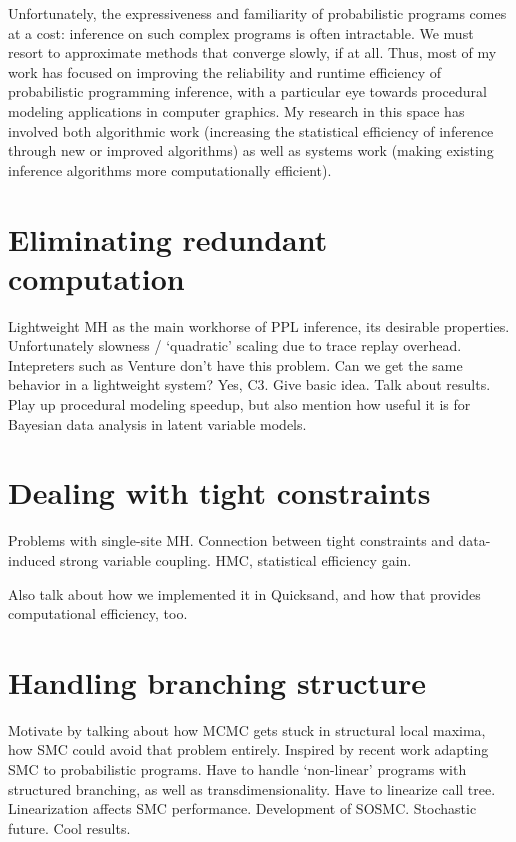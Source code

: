 \documentclass[
11pt, %
a4paper, %
oneside, %
headinclude,footinclude, %
BCOR5mm, %
]{scrartcl}
\begin{document}
Unfortunately, the expressiveness and familiarity of probabilistic programs comes at a cost: inference on such complex programs is often intractable. We must resort to approximate methods that converge slowly, if at all. Thus, most of my work has focused on improving the reliability and runtime efficiency of probabilistic programming inference, with a particular eye towards procedural modeling applications in computer graphics. My research in this space has involved both algorithmic work (increasing the statistical efficiency of inference through new or improved algorithms) as well as systems work (making existing inference algorithms more computationally efficient).

\section*{Eliminating redundant computation}

Lightweight MH as the main workhorse of PPL inference, its desirable properties. Unfortunately slowness / `quadratic' scaling due to trace replay overhead. Intepreters such as Venture don't have this problem. Can we get the same behavior in a lightweight system? Yes, C3. Give basic idea. Talk about results. Play up procedural modeling speedup, but also mention how useful it is for Bayesian data analysis in latent variable models.

\section*{Dealing with tight constraints}

Problems with single-site MH. Connection between tight constraints and data-induced strong variable coupling. HMC, statistical efficiency gain.

Also talk about how we implemented it in Quicksand, and how that provides computational efficiency, too.

\section*{Handling branching structure}

Motivate by talking about how MCMC gets stuck in structural local maxima, how SMC could avoid that problem entirely. Inspired by recent work adapting SMC to probabilistic programs. Have to handle `non-linear' programs with structured branching, as well as transdimensionality. Have to linearize call tree. Linearization affects SMC performance. Development of SOSMC. Stochastic future. Cool results.
\end{document}
